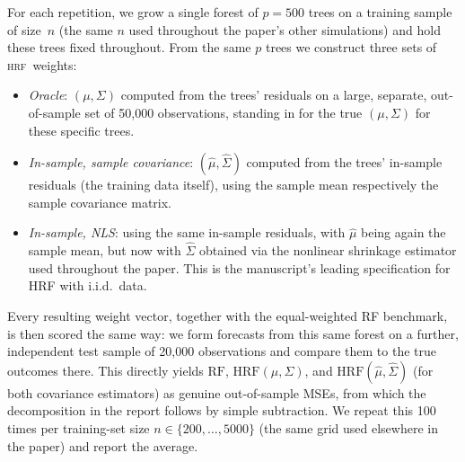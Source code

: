 \documentclass[12pt]{article}
\newcommand{\hrf}{\textsc{hrf}}
\begin{document}
For each repetition, we grow a single forest of $p = 500$ trees on a
training sample of size~$n$ (the same $n$ used throughout the paper's other
simulations) and hold these trees fixed throughout. From the same $p$
trees we construct three sets of \hrf\ weights:
\begin{itemize}
\item \emph{Oracle}: $(\mu,\Sigma)$ computed from the trees'
residuals on a large, separate, out-of-sample set of 50{,}000
observations, standing in for the true $(\mu, \Sigma)$ for these specific
trees.
\item \emph{In-sample, sample covariance}: $(\hat\mu, \hat\Sigma)$
computed from the trees' in-sample residuals (the training data itself),
using the sample mean respectively the sample covariance matrix.
\item \emph{In-sample, NLS}: using the same in-sample residuals,
with $\hat \mu$ being again the sample mean,
but now with $\hat\Sigma$ obtained via the nonlinear shrinkage estimator used
throughout the paper. This is the manuscript's leading specification for HRF with i.i.d.\ data.
\end{itemize}
Every resulting weight vector, together with the equal-weighted RF
benchmark, is then scored the same way: we form forecasts from this same
forest on a further, independent test sample of 20{,}000 observations and
compare them to the true outcomes there. This directly yields
$\text{RF}$, $\text{HRF}(\mu,\Sigma)$, and $\text{HRF}(\hat \mu, \hat\Sigma)$ (for both
covariance estimators) as genuine out-of-sample MSEs, from which the
decomposition in the report follows by simple subtraction. We repeat this
100 times per training-set size $n \in \{200, \ldots, 5000\}$ (the same
grid used elsewhere in the paper) and report the average.
\end{document}
